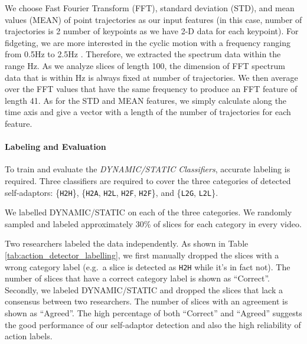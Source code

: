 We choose Fast Fourier Transform (FFT), standard deviation (STD), and mean values (MEAN) of point trajectories as our input features (in this case, number of trajectories is 2  number of keypoints as we have 2-D data for each keypoint). 
For fidgeting, we are more interested in the cyclic motion with a frequency ranging from 0.5Hz to 2.5Hz \cite{mahmoud2013automatic}. Therefore, we extracted the spectrum data within the range  Hz.
As we analyze slices of length 100, the dimension of FFT spectrum data that is within  Hz is always fixed at  number of trajectories. 
We then average over the FFT values that have the same frequency to produce an FFT feature of length 41. As for the STD and MEAN features, we simply calculate along the time axis and give a vector with a length of the number of trajectories for each feature.


\paragraph{Labeling and Evaluation}
To train and evaluate the \textit{DYNAMIC/STATIC Classifiers}, accurate labeling is required. Three classifiers are required to cover the three categories of detected self-adaptors: \{\texttt{H2H}\}, \{\texttt{H2A}, \texttt{H2L}, \texttt{H2F}, \texttt{H2F}\}, and \{\texttt{L2G}, \texttt{L2L}\}.

We labelled DYNAMIC/STATIC on each of the three categories. We randomly sampled and labeled approximately 30\% of slices for each category in every video. 

Two researchers labeled the data independently. As shown in Table \ref{tab:action_detector_labelling}, we first manually dropped the slices with a wrong category label (e.g.\ a slice is detected as \texttt{H2H} while it's in fact not). The number of slices that have a correct category label is shown as ``Correct''. Secondly, we labeled DYNAMIC/STATIC and dropped the slices that lack a consensus between two researchers. The number of slices with an agreement is shown as ``Agreed''. The high percentage of both ``Correct'' and ``Agreed'' suggests the good performance of our self-adaptor detection and also the high reliability of action labels.









